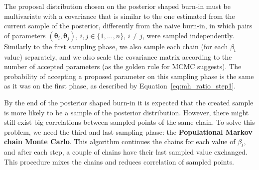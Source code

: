 The proposal distribution chosen on the posterior shaped burn-in must be 
multivariate with a covariance that is similar to the one estimated from 
the current sample of the posterior, differently from the naive burn-in, 
in which pairs of parameters $({\bm \theta_i}, {\bm \theta_j})$, $i, j 
\in \{1, \ldots, n\}$, $i \neq j$, were sampled independently. Similarly
to the first sampling phase, we also sample each chain (for each
$\beta_t$ value) separately, and we also scale the covariance matrix
according to the number of accepted parameters (as the golden rule for
MCMC suggests). The probability of accepting a proposed parameter on
this sampling phase is the same as it was on the first phase, as 
described by Equation~\ref{eq:mh_ratio_step1}.

By the end of the posterior shaped burn-in it is expected that the
created sample is more likely to be a sample of the posterior
distribution. However, there might still exist big correlations between
sampled points of the same chain. To solve this problem, we need the
third and last sampling phase: the {\bf Populational Markov chain Monte Carlo}. This algorithm continues the chains for each value of $\beta_t$,
and after each step, a couple of chains have their last sampled value
exchanged. This procedure mixes the chains and reduces correlation of
sampled points.


